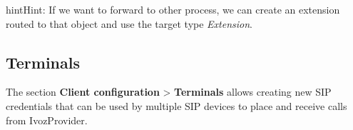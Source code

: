 \documentclass[letterpaper,10pt,english]{sphinxmanual}
\begin{document}
\begin{notice}{hint}{Hint:}
If we want to forward to other process, we can create an extension
routed to that object and use the target type \emph{Extension}.
\end{notice}


\subsection{Terminals}
\label{administration_portal/client/vpbx/terminals:terminals}\label{administration_portal/client/vpbx/terminals::doc}\label{administration_portal/client/vpbx/terminals:id1}
The section \textbf{Client configuration} \textgreater{} \textbf{Terminals} allows creating new
SIP credentials that can be used by multiple SIP devices to place and receive
calls from IvozProvider.
\end{document}
